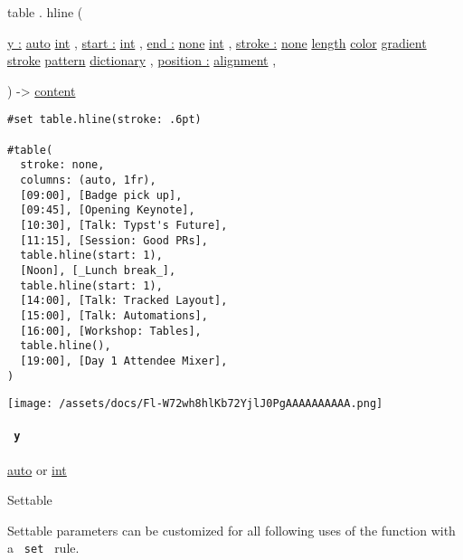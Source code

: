 table { . } { hline } (

{ \hyperref[definitions-hline-parameters-y]{y :}
\href{/docs/reference/foundations/auto/}{auto}
\href{/docs/reference/foundations/int/}{int} , } {
\hyperref[definitions-hline-parameters-start]{start :}
\href{/docs/reference/foundations/int/}{int} , } {
\hyperref[definitions-hline-parameters-end]{end :}
\href{/docs/reference/foundations/none/}{none}
\href{/docs/reference/foundations/int/}{int} , } {
\hyperref[definitions-hline-parameters-stroke]{stroke :}
\href{/docs/reference/foundations/none/}{none}
\href{/docs/reference/layout/length/}{length}
\href{/docs/reference/visualize/color/}{color}
\href{/docs/reference/visualize/gradient/}{gradient}
\href{/docs/reference/visualize/stroke/}{stroke}
\href{/docs/reference/visualize/pattern/}{pattern}
\href{/docs/reference/foundations/dictionary/}{dictionary} , } {
\hyperref[definitions-hline-parameters-position]{position :}
\href{/docs/reference/layout/alignment/}{alignment} , }

) -\textgreater{} \href{/docs/reference/foundations/content/}{content}

\begin{verbatim}
#set table.hline(stroke: .6pt)

#table(
  stroke: none,
  columns: (auto, 1fr),
  [09:00], [Badge pick up],
  [09:45], [Opening Keynote],
  [10:30], [Talk: Typst's Future],
  [11:15], [Session: Good PRs],
  table.hline(start: 1),
  [Noon], [_Lunch break_],
  table.hline(start: 1),
  [14:00], [Talk: Tracked Layout],
  [15:00], [Talk: Automations],
  [16:00], [Workshop: Tables],
  table.hline(),
  [19:00], [Day 1 Attendee Mixer],
)
\end{verbatim}

\texttt{[image: /assets/docs/Fl-W72wh8hlKb72YjlJ0PgAAAAAAAAAA.png]}

\paragraph{\texorpdfstring{\texttt{\ y\ }}{ y }}\label{definitions-hline-y}

\href{/docs/reference/foundations/auto/}{auto} {or}
\href{/docs/reference/foundations/int/}{int}

{{ Settable }}

\label{definitions-hline-y-settable-tooltip}
Settable parameters can be customized for all following uses of the
function with a \texttt{\ set\ } rule.

